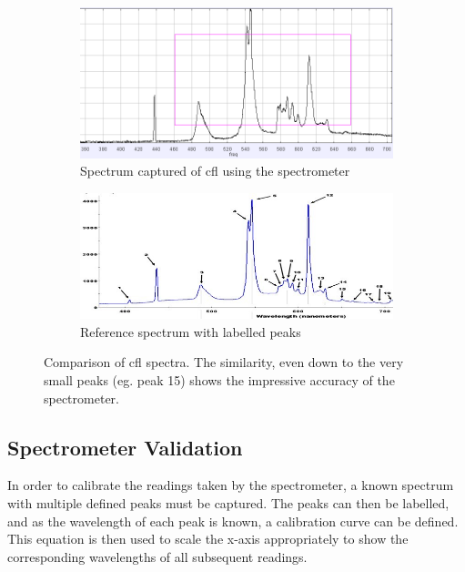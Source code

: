 \begin{figure}[bt]
\centering
	\begin{subfigure}[ht]{0.5\textwidth}
	\includegraphics[width=\textwidth]{images/calibration.png}
	\caption{Spectrum captured of \acrshort{cfl} using the spectrometer}
	\end{subfigure}

	\begin{subfigure}[ht]{0.5\textwidth}
	\includegraphics[width=\textwidth]{images/CFL.jpg}
	\caption{Reference spectrum with labelled peaks \citep{padleckasFileFluorescentLighting2005}}
	\end{subfigure}
	
\caption{Comparison of \acrshort{cfl} spectra. The similarity, even down to the very small peaks (eg. peak 15) shows the impressive accuracy of the spectrometer.}
\label{Fig:CFL}
\end{figure}

\subsection{Spectrometer Validation}

In order to calibrate the readings taken by the spectrometer, a known spectrum with multiple defined peaks must be captured. The peaks can then be labelled, and as the wavelength of each peak is known, a calibration curve can be defined. This equation is then used to scale the x-axis appropriately to show the corresponding wavelengths of all subsequent readings.


